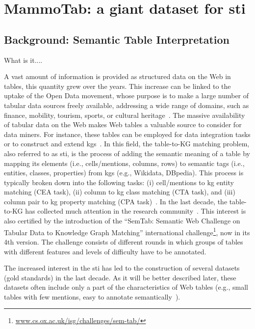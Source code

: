 \section{MammoTab: a giant dataset for \acs{sti}}

\subsection{Background: Semantic Table Interpretation}
What is it....

A vast amount of information is provided as structured data on the Web in tables, this quantity grew over the years. This increase can be linked to the uptake of the Open Data movement, whose purpose is to make a large number of tabular data sources freely available, addressing a wide range of domains, such as finance, mobility, tourism, sports, or cultural heritage~\cite{Neumaier2016}. The massive availability of tabular data on the Web makes Web tables a valuable source to consider for data miners. For instance, these tables can be employed for data integration tasks or to construct and extend \acp{kg}~\cite{Kejriwal2021}. In this field, the table-to-KG matching problem, also referred to as \ac{sti}, is the process of adding the semantic meaning of a table by mapping its elements (i.e., cells/mentions, columns, rows) to semantic tags (i.e., entities, classes, properties) from \acp{kg} (e.g., Wikidata, DBpedia). This process is typically broken down into the following tasks: (i) cell/mentions to \ac{kg} entity matching (CEA task), (ii) column to \ac{kg} class matching (CTA task), and (iii) column pair to \ac{kg} property matching (CPA task)~\cite{Cutrona2021-1}. In the last decade, the table-to-KG has collected much attention in the research community~\cite{Cutrona2021-1}. This interest is also certified by the introduction of the ``SemTab: Semantic Web Challenge on Tabular Data to Knowledge Graph Matching'' international challenge\footnote{\href{https://www.cs.ox.ac.uk/isg/challenges/sem-tab/}{www.cs.ox.ac.uk/isg/challenges/sem-tab/}}, now in its 4th version. The challenge consists of different rounds in which groups of tables with different features and levels of difficulty have to be annotated.


The increased interest in the \ac{sti} has led to the construction of several datasets (gold standards) in the last decade. As it will be better described later, these datasets often include only a part of the characteristics of Web tables 
(e.g., small tables with few mentions, easy to annotate semantically~\cite{Zhang2020}).

